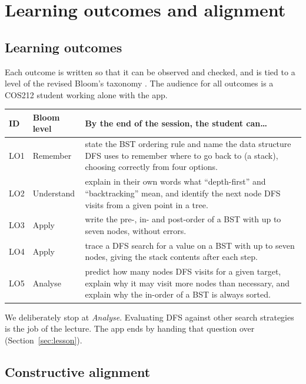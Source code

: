 \documentclass[11pt,a4paper]{article}
\begin{document}
\section{Learning outcomes and alignment}
\label{sec:outcomes}

\subsection{Learning outcomes}

Each outcome is written so that it can be observed and checked, and is tied to a level of the
revised Bloom's taxonomy \cite{anderson2001}. The audience for all outcomes is a COS212 student
working alone with the app.

\begin{longtable}{@{}p{0.9cm} p{2.0cm} p{12.0cm}@{}}
  \toprule
  \textbf{ID} & \textbf{Bloom level} & \textbf{By the end of the session, the student can\ldots} \\
  \midrule
  \endhead
  LO1 & Remember & state the BST ordering rule and name the data structure DFS uses to remember
        where to go back to (a stack), choosing correctly from four options. \\
  LO2 & Understand & explain in their own words what ``depth-first'' and ``backtracking'' mean,
        and identify the next node DFS visits from a given point in a tree. \\
  LO3 & Apply & write the pre-, in- and post-order of a BST with up to seven nodes, without
        errors. \\
  LO4 & Apply & trace a DFS search for a value on a BST with up to seven nodes, giving the stack
        contents after each step. \\
  LO5 & Analyse & predict how many nodes DFS visits for a given target, explain why it may visit
        more nodes than necessary, and explain why the in-order of a BST is always sorted. \\
  \bottomrule
\end{longtable}

We deliberately stop at \emph{Analyse}. Evaluating DFS against other search strategies is the job
of the lecture. The app ends by handing that question over (Section~\ref{sec:lesson}).

\subsection{Constructive alignment}
\end{document}
